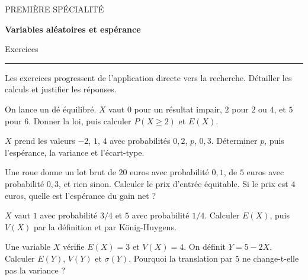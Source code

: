 \documentclass[11pt,a4paper]{article}
\begin{document}
{\small\color{Blue}PREMIÈRE SPÉCIALITÉ}\par{\LARGE\bfseries Variables aléatoires et espérance}\par{\large Exercices}\par\vspace{0.2cm}\hrule\vspace{0.4cm}
Les exercices progressent de l’application directe vers la recherche. Détailler les calculs et justifier les réponses.
\par\noindent\begin{minipage}{\linewidth}
On lance un dé équilibré. $X$ vaut $0$ pour un résultat impair, $2$ pour $2$ ou $4$, et $5$ pour $6$. Donner la loi, puis calculer $P(X\ge2)$ et $E(X)$.
\end{minipage}\par
\par\noindent\begin{minipage}{\linewidth}
$X$ prend les valeurs $-2$, $1$, $4$ avec probabilités $0,2$, $p$, $0,3$. Déterminer $p$, puis l’espérance, la variance et l’écart-type.
\end{minipage}\par
\par\noindent\begin{minipage}{\linewidth}
Une roue donne un lot brut de $20$ euros avec probabilité $0,1$, de $5$ euros avec probabilité $0,3$, et rien sinon. Calculer le prix d’entrée équitable. Si le prix est $4$ euros, quelle est l’espérance du gain net ?
\end{minipage}\par
\par\noindent\begin{minipage}{\linewidth}
$X$ vaut $1$ avec probabilité $3/4$ et $5$ avec probabilité $1/4$. Calculer $E(X)$, puis $V(X)$ par la définition et par König-Huygens.
\end{minipage}\par
\par\noindent\begin{minipage}{\linewidth}
Une variable $X$ vérifie $E(X)=3$ et $V(X)=4$. On définit $Y=5-2X$. Calculer $E(Y)$, $V(Y)$ et $\sigma(Y)$. Pourquoi la translation par $5$ ne change-t-elle pas la variance ?
\end{minipage}\par
\end{document}
